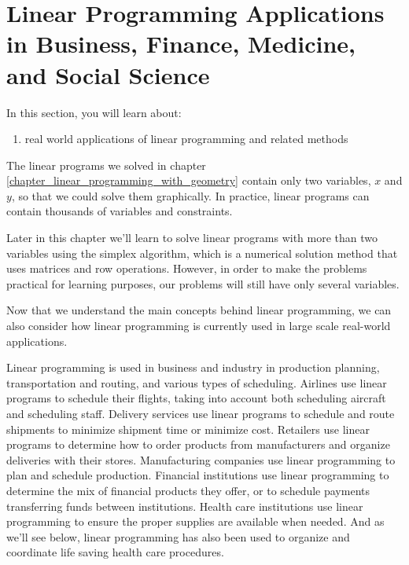 \section{Linear Programming Applications in Business, Finance, Medicine, and Social Science}

In this section, you will learn about:
\begin{enumerate}
    \item real world applications of linear programming and related methods
\end{enumerate}

The linear programs we solved in chapter \ref{chapter_linear_programming_with_geometry} contain only two variables, $x$ and $y$, so that we could solve them graphically.  In practice, linear programs can contain thousands of variables and constraints.

Later in this chapter we'll learn to solve linear programs with more than two variables using the simplex algorithm, which is a numerical solution method that uses matrices and row operations. However, in order to make the problems practical for learning purposes, our problems will still have only several variables.

Now that we understand the main concepts behind linear programming, we can also consider how linear programming is currently used in large scale real-world applications.

Linear programming is used in business and industry in production planning, transportation and routing, and various types of scheduling.  Airlines use linear programs to schedule their flights, taking into account both scheduling aircraft and scheduling staff.  Delivery services use linear programs to schedule and route shipments to minimize shipment time or minimize cost.  Retailers use linear programs to determine how to order products from manufacturers and organize deliveries with their stores.  Manufacturing companies use linear programming to plan and schedule production.  Financial institutions use linear programming to determine the mix of financial products they offer, or to schedule payments transferring funds between institutions. Health care institutions use linear programming to ensure the proper supplies are available when needed.  And as we'll see below, linear programming has also been used to organize and coordinate life saving health care procedures.

